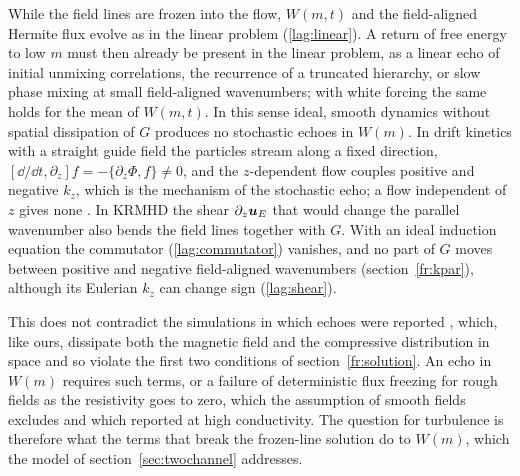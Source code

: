 While the field lines are frozen into the flow, $W(m,t)$ and the field-aligned Hermite flux evolve as in the linear problem (\ref{lag:linear}). A return of free energy to low $m$ must then already be present in the linear problem, as a linear echo of initial unmixing correlations, the recurrence of a truncated hierarchy, or slow phase mixing at small field-aligned wavenumbers; with white forcing the same holds for the mean of $W(m,t)$. In this sense ideal, smooth dynamics without spatial dissipation of $G$ produces no stochastic echoes in $W(m)$. In drift kinetics with a straight guide field \citep{Schekochihin2016,Parker2016} the particles stream along a fixed direction, $[\dd/\dd t,\partial_z]f=-\{\partial_z\Phi,f\}\neq0$, and the $z$-dependent flow couples positive and negative $k_z$, which is the mechanism of the stochastic echo; a flow independent of $z$ gives none \citetext{\citealp[appendix~B]{Schekochihin2016}; \citealp[\S5.2]{KanekarThesis2015}}. In KRMHD the shear $\partial_z\boldsymbol u_E$ that would change the parallel wavenumber also bends the field lines together with $G$. With an ideal induction equation the commutator (\ref{lag:commutator}) vanishes, and no part of $G$ moves between positive and negative field-aligned wavenumbers (section~\ref{fr:kpar}), although its Eulerian $k_z$ can change sign (\ref{lag:shear}).

This does not contradict the simulations in which echoes were reported \citep{Meyrand2019}, which, like ours, dissipate both the magnetic field and the compressive distribution in space and so violate the first two conditions of section~\ref{fr:solution}. An echo in $W(m)$ requires such terms, or a failure of deterministic flux freezing for rough fields as the resistivity goes to zero, which the assumption of smooth fields excludes and which \citet{Eyink2013} reported at high conductivity. The question for turbulence is therefore what the terms that break the frozen-line solution do to $W(m)$, which the model of section~\ref{sec:twochannel} addresses.
